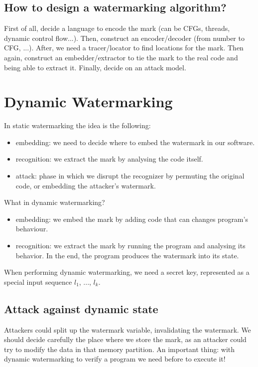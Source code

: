 \subsection{How to design a watermarking algorithm?}

First of all, decide a language to encode the mark (can be CFGs, threads, dynamic control flow...). Then, construct an encoder/decoder (from number to CFG, ...). After, we need a tracer/locator to find locations for the mark. Then again, construct an embedder/extractor to tie the mark to the real code and being able to extract it. 
Finally, decide on an attack model.

\section{Dynamic Watermarking}

In static watermarking the idea is the following:
\begin{itemize}
    \item embedding: we need to decide where to embed the watermark in our software.
    \item recognition: we extract the mark by analysing the code itself.
    \item attack: phase in which we disrupt the recognizer by permuting the original code, or embedding the attacker's watermark.
\end{itemize}

What in dynamic watermarking? 
\begin{itemize}
    \item embedding: we embed the mark by adding code that can changes program's behaviour.
    \item recognition: we extract the mark by running the program and analysing its behavior. 
    In the end, the program produces the watermark into its state. 
\end{itemize}

When performing dynamic watermarking, we need a secret key, represented as a special input sequence $l_1$, ..., $l_k$.

\subsection{Attack against dynamic state}

Attackers could split up the watermark variable, invalidating the watermark.
We should decide carefully the place where we store the mark, as an attacker could try to modify the data in that memory partition. 
An important thing: with dynamic watermarking to verify a program we need before to execute it!

